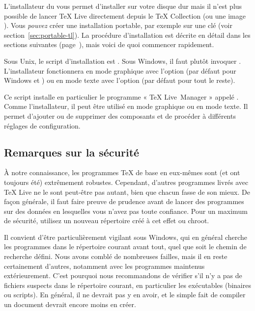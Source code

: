 \documentclass[german, english, french]{article}
\renewcommand{\TL}{\TeX{} Live\xspace}%
\renewcommand{\TK}{\TeX{} Collection\xspace}%
\def\p.{page~}
\begin{document}
L'installateur du \DVD vous permet d'installer sur votre disque dur mais il
n'est plus possible de lancer \TL{} directement depuis le \DVD{} \TK{} (ou une
image ). Vous \emph{pouvez} créer une installation portable, par
exemple sur une clé \USB{} (voir section~\ref{sec:portable-tl}). La procédure
d'installation est décrite en détail dans les sections suivantes
(\p.\pageref{sec:install}), mais voici de quoi commencer rapidement.

\begin{itemize*}

\item Sous Unix, le script d'installation est .  Sous
  Windows, il faut plutôt invoquer .
  L'installateur fonctionnera en mode graphique avec l'option 
  (par défaut pour Windows et \MacOSX) ou en mode texte avec l'option
   (par défaut pour tout le reste).

\item Ce script installe en particulier le programme « \TL\ Manager » appelé
  . Comme l'installateur, il peut être utilisé en mode graphique ou
  en mode texte. Il permet d'ajouter ou de supprimer des composants et de
  procéder à différents réglages de configuration.

\end{itemize*}

\subsection{Remarques sur la sécurité}
\label{sec:security}

À notre connaissance, les programmes \TeX{} de base en eux-mêmes sont (et ont
toujours été) extrêmement robustes. Cependant, d'autres programmes livrés avec
\TL{} ne le sont peut-être pas autant, bien que chacun fasse de son mieux. De
façon générale, il faut faire preuve de prudence avant de lancer des programmes
sur des données en lesquelles vous n'avez pas toute confiance. Pour un maximum
de sécurité, utilisez un nouveau répertoire créé à cet effet ou chroot.

Il convient d'être particulièrement vigilant sous Windows, qui en général
cherche les programmes dans le répertoire courant avant tout, quel que soit le
chemin de recherche défini. Nous avons comblé de nombreuses failles, mais il en
reste certainement d'autres, notamment avec les programmes maintenus
extérieurement. C'est pourquoi nous recommandons de vérifier s'il n'y a pas de
fichiers suspects dans le répertoire courant, en particulier les exécutables
(binaires ou scripts). En général, il ne devrait pas y en avoir, et le simple
fait de compiler un document devrait encore moins en créer.
\end{document}
